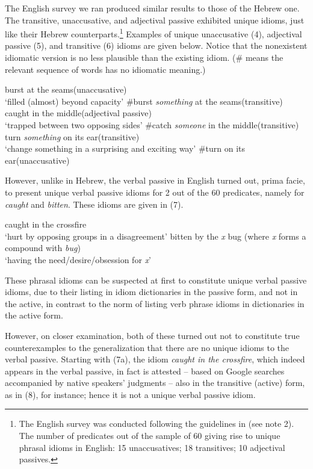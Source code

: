 \documentclass[output=paper,
modfonts
]{LSP/langsci}
\begin{document}
The English survey we ran produced similar results to those of the
Hebrew one. The transitive, unaccusative, and adjectival passive
exhibited unique idioms, just like their Hebrew counterparts.\footnote{The
English survey was conducted following the guidelines in \citet{horvath2009} (see note 2). The number of predicates out of the sample
of 60 giving rise to unique phrasal idioms in English: 15
unaccusatives; 18 transitives; 10 adjectival passives.} Examples of
unique unaccusative (4), adjectival passive (5), and transitive (6)
idioms are given below. Notice that the nonexistent idiomatic version is
no less plausible than the existing idiom. (\# means the relevant
sequence of words has no idiomatic meaning.)

\ea
	\ea burst at the seams\hfill (unaccusative)\\
	`filled (almost) beyond capacity'
	\ex \#burst \emph{something} at the seams\hfill (transitive)
	\z
\ex 
	\ea caught in the middle\hfill (adjectival passive)\\
	`trapped between two opposing sides'
	\ex \#catch \emph{someone} in the middle\hfill (transitive)
	\z
\ex
	\ea turn \emph{something} on its ear\hfill (transitive)\\
	`change something in a surprising and exciting way'
	\ex \#turn on its ear\hfill (unaccusative)
	\z
\z

However, unlike in Hebrew, the verbal passive in English turned out,
prima facie, to present unique verbal passive idioms for 2 out of the 60
predicates, namely for \emph{caught} and \emph{bitten}. These idioms are
given in (7).

\ea 
	\ea caught in the crossfire\\
	`hurt by opposing groups in a disagreement'
	\ex bitten by the \emph{x} bug (where \emph{x} forms a compound with
\emph{bug})\\
	`having the need/desire/obsession for \emph{x}'
	\z
\z

These phrasal idioms can be suspected at first to constitute unique
verbal passive idioms, due to their listing in idiom dictionaries in the
passive form, and not in the active, in contrast to the norm of listing
verb phrase idioms in dictionaries in the active form.

However, on closer examination, both of these turned out not to
constitute true counterexamples to the generalization that there are no
unique idioms to the verbal passive. Starting with (7a), the idiom
\emph{caught in the crossfire}, which indeed appears in the verbal
passive, in fact is attested -- based on Google searches accompanied by
native speakers' judgments -- also in the transitive (active) form, as
in (8), for instance; hence it is not a unique verbal passive idiom.
\end{document}
